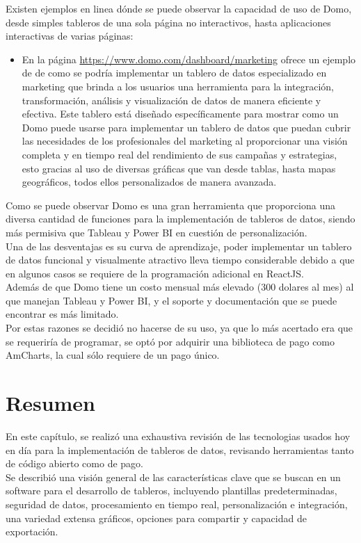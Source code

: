 Existen ejemplos en linea dónde se puede observar la capacidad de uso de Domo, desde simples tableros de una sola página no interactivos, hasta aplicaciones interactivas de varias páginas:

\begin{itemize}
    \item En la página \url{https://www.domo.com/dashboard/marketing} ofrece un ejemplo de de como se podría implementar un tablero de datos especializado en marketing que brinda a los usuarios una herramienta para la integración, transformación, análisis y visualización de datos de manera eficiente y efectiva. Este tablero está diseñado específicamente para mostrar como un Domo puede usarse para implementar un tablero de datos que puedan cubrir las necesidades de los profesionales del marketing al proporcionar una visión completa y en tiempo real del rendimiento de sus campañas y estrategias, esto gracias al uso de diversas gráficas que van desde tablas, hasta mapas geográficos, todos ellos personalizados de manera avanzada.
\end{itemize}

Como se puede observar Domo es una gran herramienta que proporciona una diversa cantidad de funciones para la implementación de tableros de datos, siendo más permisiva que Tableau y Power BI en cuestión de personalización.\\
Una de las desventajas es su curva de aprendizaje, poder implementar un tablero de datos funcional y visualmente atractivo lleva tiempo considerable debido a que en algunos casos se requiere de la programación adicional en ReactJS.\\
Además de que Domo tiene un costo mensual más elevado (300 dolares al mes) al que manejan Tableau y Power BI, y el soporte y documentación que se puede encontrar es más limitado.\\

Por estas razones se decidió no hacerse de su uso, ya que lo más acertado era que se requeriría de programar, se optó por adquirir una biblioteca de pago como AmCharts, la cual sólo requiere de un pago único.

\section{Resumen}
En este capítulo, se realizó una exhaustiva revisión de las tecnologias usados hoy en día para la implementación de tableros de datos, revisando herramientas tanto de código abierto como de pago. \\
Se describió una visión general de las características clave que se buscan en un software para el desarrollo de tableros, incluyendo plantillas predeterminadas, seguridad de datos, procesamiento en tiempo real, personalización e integración, una variedad extensa gráficos, opciones para compartir y capacidad de exportación.
\\

